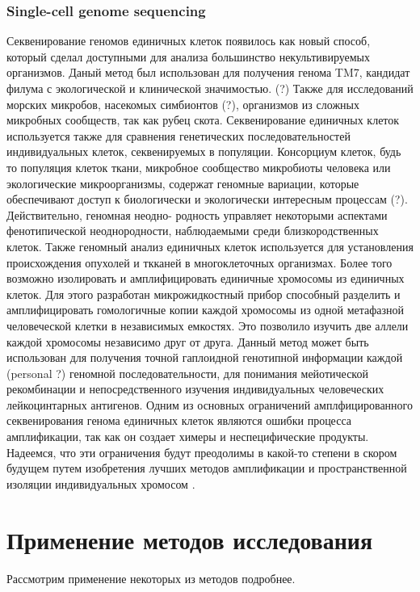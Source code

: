 \subsubsection{Single-cell genome sequencing}
Секвенирование геномов единичных клеток появилось как
новый способ, который сделал доступными для анализа большинство некультивируемых организмов. Даный метод был использован для получения генома TM7, кандидат филума с
экологической и клинической значимостью. (?) Также для исследований морских микробов,
насекомых симбионтов (?), организмов из сложных микробных сообществ, так как рубец
скота. Секвенирование единичных клеток используется также для сравнения генетических
последовательностей индивидуальных клеток, секвенируемых в популяции. Консорциум клеток, будь то популяция клеток ткани, микробное сообщество микробиоты человека или экологические микроорганизмы, содержат геномные вариации, которые обеспечивают доступ к
биологически и экологически интересным процессам (?). Действительно, геномная неодно-
родность управляет некоторыми аспектами фенотипической неоднородности, наблюдаемыми
среди близкородственных клеток. Также геномный анализ единичных клеток используется
для установления происхождения опухолей и ткканей в многоклеточных организмах. Более того возможно изолировать и амплифицировать единичные хромосомы из единичных
клеток. Для этого разработан микрожидкостный прибор способный разделить и амплифицировать гомологичные копии каждой хромосомы из одной метафазной человеческой клетки
в независимых емкостях. Это позволило изучить две аллели каждой хромосомы независимо
друг от друга. Данный метод может быть использован для получения точной гаплоидной
генотипной информации каждой (personal ?) геномной последовательности, для понимания
мейотической рекомбинации и непосредственного изучения индивидуальных человеческих
лейкоцинтарных антигенов. Одним из основных ограничений амплфицированного секвенирования генома единичных клеток являются ошибки процесса амплификации, так как он
создает химеры и неспецифические продукты. Надеемся, что эти ограничения будут преодолимы в какой-то степени в скором будущем путем изобретения лучших методов амплификации и пространственной изоляции индивидуальных хромосом \cite{Kalisky2014, Roh2010}.

\section{Применение методов исследования}
Рассмотрим применение некоторых из методов подробнее.

